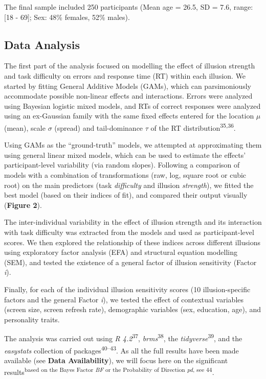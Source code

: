 \documentclass[
  man,floatsintext]{apa6}
\begin{document}
The final sample included 250 participants (Mean age = 26.5, SD = 7.6, range: {[}18 - 69{]}; Sex: 48\% females, 52\% males).

\hypertarget{data-analysis}{%
\subsection{Data Analysis}\label{data-analysis}}

The first part of the analysis focused on modelling the effect of illusion strength and task difficulty on errors and response time (RT) within each illusion. We started by fitting General Additive Models (GAMs), which can parsimoniously accommodate possible non-linear effects and interactions. Errors were analyzed using Bayesian logistic mixed models, and RTs of correct responses were analyzed using an ex-Gaussian family with the same fixed effects entered for the location \(\mu\) (mean), scale \(\sigma\) (spread) and tail-dominance \(\tau\) of the RT distribution\textsuperscript{35,36}.

Using GAMs as the ``ground-truth'' models, we attempted at approximating them using general linear mixed models, which can be used to estimate the effects' participant-level variability (via random slopes). Following a comparison of models with a combination of transformations (raw, log, square root or cubic root) on the main predictors (task \emph{difficulty} and illusion \emph{strength}), we fitted the best model (based on their indices of fit), and compared their output visually (\textbf{Figure 2}).

The inter-individual variability in the effect of illusion strength and its interaction with task difficulty was extracted from the models and used as participant-level scores. We then explored the relationship of these indices across different illusions using exploratory factor analysis (EFA) and structural equation modelling (SEM), and tested the existence of a general factor of illusion sensitivity (Factor \emph{i}).

Finally, for each of the individual illusion sensitivity scores (10 illusion-specific factors and the general Factor \emph{i}), we tested the effect of contextual variables (screen size, screen refresh rate), demographic variables (sex, education, age), and personality traits.

The analysis was carried out using \emph{R 4.2}\textsuperscript{37}, \emph{brms}\textsuperscript{38}, the \emph{tidyverse}\textsuperscript{39}, and the \emph{easystats} collection of packages\textsuperscript{40--43}. As all the full results have been made available (see \textbf{Data Availability}), we will focus here on the significant results\textsuperscript{based on the Bayes Factor \emph{BF} or the Probability of Direction \emph{pd}, see 44}.
\end{document}
